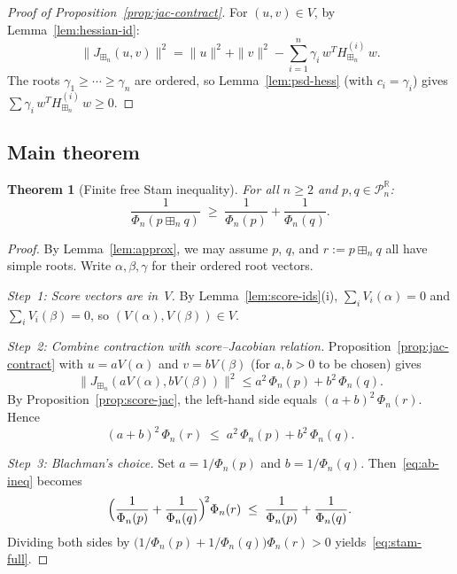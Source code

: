 \documentclass[10pt,a4paper]{amsart}
\theoremstyle{plain}
\newtheorem{theorem}{Theorem}[section]
\theoremstyle{definition}
\theoremstyle{remark}
\newcommand{\R}{\mathbb{R}}
\newcommand{\PnR}[1][n]{\mathcal{P}^{\R}_{#1}}
\newcommand{\fp}{\boxplus_n}
\begin{document}
\begin{proof}[Proof of
Proposition~\textup{\ref{prop:jac-contract}}]
For $(u,v)\in V$, by
Lemma~\ref{lem:hessian-id}:
\[
  \|J_{\fp}(u,v)\|^2
  =\|u\|^2+\|v\|^2
  -\sum_{i=1}^n\gamma_i\,w^TH^{(i)}_{\fp}\,w.
\]
The roots $\gamma_1\ge\cdots\ge\gamma_n$ are ordered,
so Lemma~\ref{lem:psd-hess} (with $c_i=\gamma_i$)
gives $\sum\gamma_i\,w^TH^{(i)}_{\fp}\,w\ge 0$.
\end{proof}

\subsection{Main theorem}

\begin{theorem}[Finite free Stam inequality]
\label{thm:stam-full}
For all $n\ge 2$ and $p,q\in\PnR$:
\begin{equation}\label{eq:stam-full}
  \frac{1}{\Phi_n(p\fp q)}
  \;\ge\;\frac{1}{\Phi_n(p)}+\frac{1}{\Phi_n(q)}.
\end{equation}
\end{theorem}

\begin{proof}
By Lemma~\ref{lem:approx}, we may assume
$p$, $q$, and $r:=p\fp q$ all have simple roots.
Write $\alpha,\beta,\gamma$ for their ordered
root vectors.

\emph{Step~1: Score vectors are in~$V$.}
By Lemma~\ref{lem:score-ids}\textup{(i)},
$\sum_i V_i(\alpha)=0$ and
$\sum_i V_i(\beta)=0$,
so $(V(\alpha),V(\beta))\in V$.

\emph{Step~2: Combine contraction with
score--Jacobian relation.}
Proposition~\ref{prop:jac-contract} with
$u=aV(\alpha)$ and $v=bV(\beta)$
(for $a,b>0$ to be chosen) gives
\[
  \bigl\|J_{\fp}(aV(\alpha),bV(\beta))\bigr\|^2
  \le a^2\,\Phi_n(p)+b^2\,\Phi_n(q).
\]
By Proposition~\ref{prop:score-jac},
the left-hand side equals
$(a+b)^2\,\Phi_n(r)$.
Hence
\begin{equation}\label{eq:ab-ineq}
  (a+b)^2\,\Phi_n(r)
  \;\le\;a^2\,\Phi_n(p)+b^2\,\Phi_n(q).
\end{equation}

\emph{Step~3: Blachman's choice.}
Set $a=1/\Phi_n(p)$ and $b=1/\Phi_n(q)$.
Then~\eqref{eq:ab-ineq} becomes
\[
  \Bigl(\frac{1}{\Phi_n(p)}+\frac{1}{\Phi_n(q)}\Bigr)^{\!2}
  \Phi_n(r)
  \;\le\;\frac{1}{\Phi_n(p)}+\frac{1}{\Phi_n(q)}.
\]
Dividing both sides by
$\bigl(1/\Phi_n(p)+1/\Phi_n(q)\bigr)\Phi_n(r)>0$
yields~\eqref{eq:stam-full}.
\end{proof}
\end{document}
